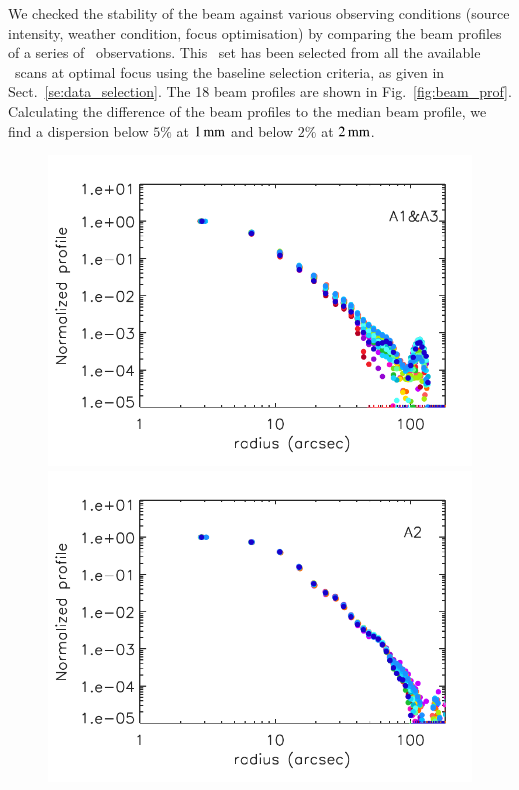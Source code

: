 We checked the stability of the beam against various observing
conditions (source intensity, weather condition, focus optimisation) by
comparing the beam profiles of a series of \bm\ observations.
This \bm\ set has been selected from all the available \bm\ scans at
optimal focus using the baseline selection criteria, as given in
Sect.~\ref{se:data_selection}.
The 18 beam profiles are shown in
Fig.~\ref{fig:beam_prof}. Calculating the difference of the beam
profiles to the median beam profile, we find a dispersion below $5\%$ at
$1\,\rm{mm}$ and below $2\%$ at $2\,\rm{mm}$. 

\begin{figure}[!thbp]
  \centering
   \includegraphics[clip, width=\linewidth]{Figures/plot_profiles_1mm.pdf}
   \includegraphics[clip, width=\linewidth]{Figures/plot_profiles_a2.pdf}

\end{figure}
